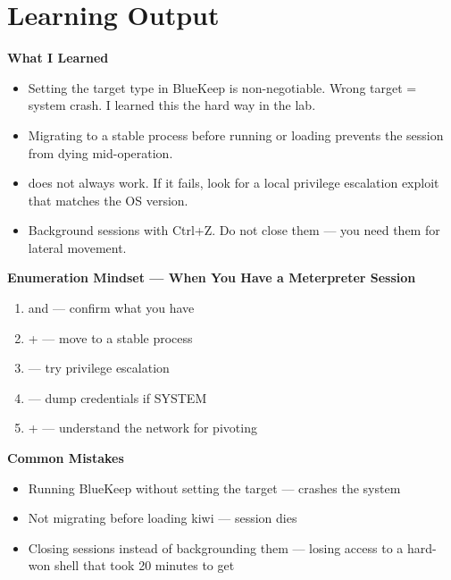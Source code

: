 \section{Learning Output}

\begin{takebox}
\textbf{What I Learned}
\begin{itemize}
  \item Setting the target type in BlueKeep is non-negotiable. Wrong target =
        system crash. I learned this the hard way in the lab.
  \item Migrating to a stable process before running  or loading
         prevents the session from dying mid-operation.
  \item {} does not always work. If it fails, look for a local
        privilege escalation exploit that matches the OS version.
  \item Background sessions with Ctrl+Z. Do not close them --- you need them
        for lateral movement.
\end{itemize}

\textbf{Enumeration Mindset --- When You Have a Meterpreter Session}
\begin{enumerate}
  \item {} and  --- confirm what you have
  \item {} +  --- move to a stable process
  \item {} --- try privilege escalation
  \item {} --- dump credentials if SYSTEM
  \item {} +  --- understand the network for pivoting
\end{enumerate}

\textbf{Common Mistakes}
\begin{itemize}
  \item Running BlueKeep without setting the target --- crashes the system
  \item Not migrating before loading kiwi --- session dies
  \item Closing sessions instead of backgrounding them --- losing access to
        a hard-won shell that took 20 minutes to get
\end{itemize}
\end{takebox}

